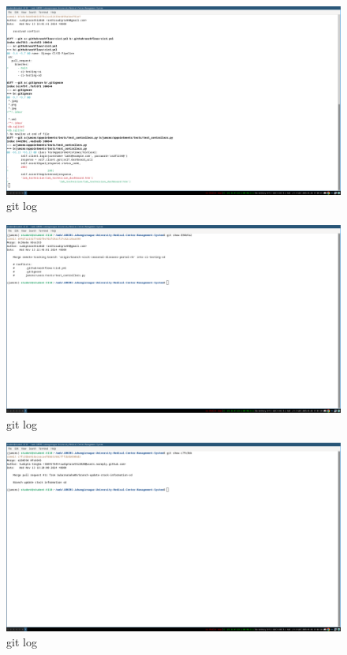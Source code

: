 \documentclass[a4paper,12pt]{article}
\begin{document}
\begin{figure}[H]
    \centering
    \includegraphics[width=1\textwidth]{images/meet45.png}
    \caption{git log}
    \label{fig:meet45}
\end{figure}

\begin{figure}[H]
    \centering
    \includegraphics[width=1\textwidth]{images/meet46.png}
    \caption{git log}
    \label{fig:meet46}
\end{figure}

\begin{figure}[H]
    \centering
    \includegraphics[width=1\textwidth]{images/meet47.png}
    \caption{git log}
    \label{fig:meet47}
\end{figure}
\end{document}
